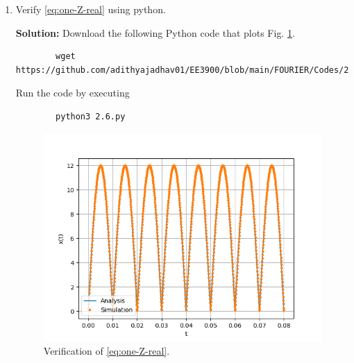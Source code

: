 \documentclass[journal,12pt,twocolumn]{IEEEtran}
\newcommand{\solution}{\noindent \textbf{Solution: }}
\providecommand{\brak}[1]{\ensuremath{\left(#1\right)}}
\numberwithin{equation}{section}
\numberwithin{figure}{section}
\renewcommand\thesection{\arabic{section}}
\begin{document}
\begin{enumerate}[label=\thesection.\arabic*,ref=\thesection.\theenumi]
\solution From \eqref{eq:one-Z-complex}, we see that since $x(t)$ is even,

\begin{align}
    x(-t) &= \sum_{k = -\infty}^{\infty}c_ke^{-\j2\pi kf_0 t} \\
          &= \sum_{k = -\infty}^{\infty}c_{-k}e^{\j2\pi kf_0t} \label{eq:sub} \\
          &= \sum_{k = -\infty}^{\infty}c_ke^{\j2\pi kf_0 t}
\end{align}

where we substitute $k := -k$ in \eqref{eq:sub}. Hence, we see that 
$c_k = c_{-k}$. So, from \eqref{eq:ak} and \eqref{eq:bk}, for $k \ge 0$,

\begin{align}
    a_k &= 
    \begin{cases}
        \frac{2A_0}{\pi} & k = 0 \\
        \frac{4A_0}{\pi\brak{1 - k^2}} & k > 0,\ k\ \text{even} \\
        0 & \text{otherwise}
    \end{cases} \label{eq:ak-xt}\\
    b_k &= 0
    \label{eq:bk-xt}
\end{align}

\item Verify 
\eqref{eq:one-Z-real}
using python.

\solution Download the following Python code that plots Fig. \ref{fig-2.6}.
	\begin{lstlisting}
		wget https://github.com/adithyajadhav01/EE3900/blob/main/FOURIER/Codes/2.6.py
	\end{lstlisting}
	
	Run the code by executing
	\begin{lstlisting}
		python3 2.6.py
	\end{lstlisting}

\begin{figure}[!ht]
    \includegraphics[width=\columnwidth]{FIGURES/2.6.png}
    \caption{Verification of \eqref{eq:one-Z-real}.}
    \label{fig-2.6}
\end{figure}
\end{enumerate}
\end{document}

